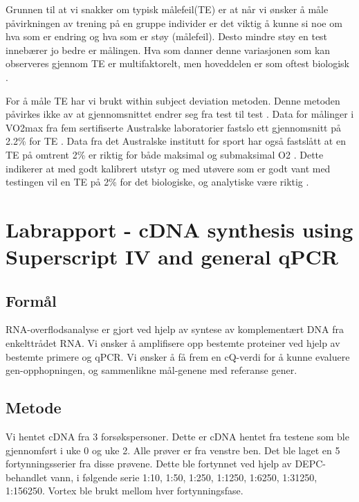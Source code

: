 \documentclass[
]{book}
\begin{document}
Grunnen til at vi snakker om typisk målefeil(TE) er at når vi ønsker å måle påvirkningen av trening på en gruppe individer er det viktig å kunne si noe om hva som er endring og hva som er støy (målefeil). Desto mindre støy en test innebærer jo bedre er målingen. Hva som danner denne variasjonen som kan observeres gjennom TE er multifaktorelt, men hoveddelen er som oftest biologisk \citep{hopkins2000}.

For å måle TE har vi brukt within subject deviation metoden. Denne metoden påvirkes ikke av at gjennomsnittet endrer seg fra test til test \citep{hopkins2000}. Data for målinger i VO2max fra fem sertifiserte Australske laboratorier fastslo ett gjennomsnitt på 2.2\% for TE \citep{halperin2015}. Data fra det Australske institutt for sport har også fastslått at en TE på omtrent 2\% er riktig for både maksimal og submaksimal O2 \citep{clark2007, robertson2010, saunders2009}. Dette indikerer at med godt kalibrert utstyr og med utøvere som er godt vant med testingen vil en TE på 2\% for det biologiske, og analytiske være riktig \citep{halperin2015}.

\hypertarget{labrapport---cdna-synthesis-using-superscript-iv-and-general-qpcr}{%
\chapter{Labrapport - cDNA synthesis using Superscript IV and general qPCR}\label{labrapport---cdna-synthesis-using-superscript-iv-and-general-qpcr}}

\hypertarget{formuxe5l}{%
\section{Formål}\label{formuxe5l}}

RNA-overflodsanalyse er gjort ved hjelp av syntese av komplementært DNA fra enkelttrådet RNA. Vi ønsker å amplifisere opp bestemte proteiner ved hjelp av bestemte primere og qPCR. Vi ønsker å få frem en cQ-verdi for å kunne evaluere gen-opphopningen, og sammenlikne mål-genene med referanse gener.

\hypertarget{metode-1}{%
\section{Metode}\label{metode-1}}

Vi hentet cDNA fra 3 forsøkspersoner. Dette er cDNA hentet fra testene som ble gjennomført i uke 0 og uke 2. Alle prøver er fra venstre ben. Det ble laget en 5 fortynningsserier fra disse prøvene. Dette ble fortynnet ved hjelp av DEPC-behandlet vann, i følgende serie 1:10, 1:50, 1:250, 1:1250, 1:6250, 1:31250, 1:156250. Vortex ble brukt mellom hver fortynningsfase.
\end{document}
